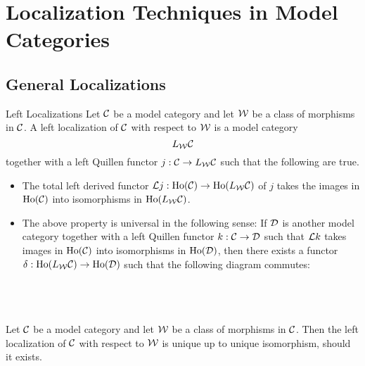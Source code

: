 \documentclass[a4paper]{article}
\begin{document}
\pagebreak
\section{Localization Techniques in Model Categories}
\subsection{General Localizations}
\begin{defn}{Left Localizations}{} Let $\mathcal{C}$ be a model category and let $\mathcal{W}$ be a class of morphisms in $\mathcal{C}$. A left localization of $\mathcal{C}$ with respect to $\mathcal{W}$ is a model category $$L_{\mathcal{W}}\mathcal{C}$$ together with a left Quillen functor $j:\mathcal{C}\to L_{\mathcal{W}}\mathcal{C}$ such that the following are true. 
\begin{itemize}
\item The total left derived functor $\mathcal{L} j:\text{Ho}(\mathcal{C})\to\text{Ho}(L_{\mathcal{W}}\mathcal{C})$ of $j$ takes the images in $\text{Ho}(\mathcal{C})$ into isomorphisms in $\text{Ho}(L_{\mathcal{W}}\mathcal{C})$. 
\item The above property is universal in the following sense: If $\mathcal{D}$ is another model category together with a left Quillen functor $k:\mathcal{C}\to\mathcal{D}$ such that $\mathcal{L} k$ takes images in $\text{Ho}(\mathcal{C})$ into isomorphisms in $\text{Ho}(\mathcal{D})$, then there exists a functor $\delta:\text{Ho}(L_{\mathcal{W}}\mathcal{C})\to\text{Ho}(\mathcal{D})$ such that the following diagram commutes: \\~\\
\\~\\
\end{itemize}
\end{defn}

\begin{prp}{}{} Let $\mathcal{C}$ be a model category and let $\mathcal{W}$ be a class of morphisms in $\mathcal{C}$. Then the left localization of $\mathcal{C}$ with respect to $\mathcal{W}$ is unique up to unique isomorphism, should it exists. 
\end{prp}
\end{document}
